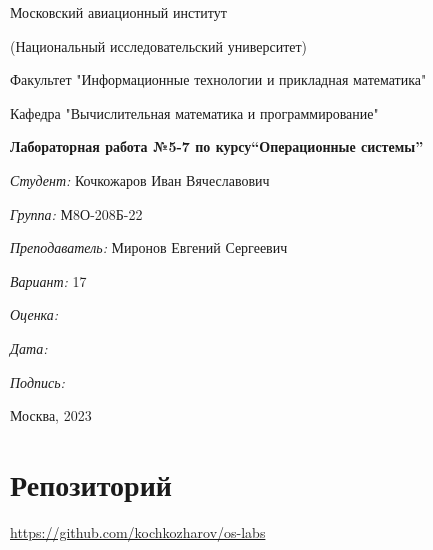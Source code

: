\documentclass[a4paper, 12pt]{article}
\begin{document}
\thispagestyle{empty}	
\begin{center}
	Московский авиационный институт
	
	(Национальный исследовательский университет)
	
	Факультет "Информационные технологии и прикладная математика"
	
	Кафедра "Вычислительная математика и программирование"
	
\end{center}
\vspace{40ex}
\begin{center}
	\textbf{\large{Лабораторная работа №5-7 по курсу\linebreak \textquotedblleft Операционные системы\textquotedblright}}
\end{center}
\vspace{35ex}
\begin{flushright}
	\textit{Студент: } Кочкожаров Иван Вячеславович
	
	\vspace{2ex}
	\textit{Группа: } М8О-208Б-22
	
	\vspace{2ex}
	\textit{Преподаватель: } Миронов Евгений Сергеевич
	
	\vspace{2ex}
	\textit{Вариант: } 17
	
	\vspace{2ex}
	\textit{Оценка: } \underline{\quad\quad\quad\quad\quad\quad}
	
	 \vspace{2ex}
	\textit{Дата: } \underline{\quad\quad\quad\quad\quad\quad}
	
	\vspace{2ex}
	\textit{Подпись: } \underline{\quad\quad\quad\quad\quad\quad}
	
\end{flushright}

\vspace{5ex}

\begin{vfill}
	\begin{center}
		Москва, 2023
	\end{center}	
\end{vfill}
\newpage

\begingroup
\color{black}
\tableofcontents\newpage
\endgroup

\section{Репозиторий}
\href{https://github.com/kochkozharov/os-labs}{https://github.com/kochkozharov/os-labs}
\end{document}
